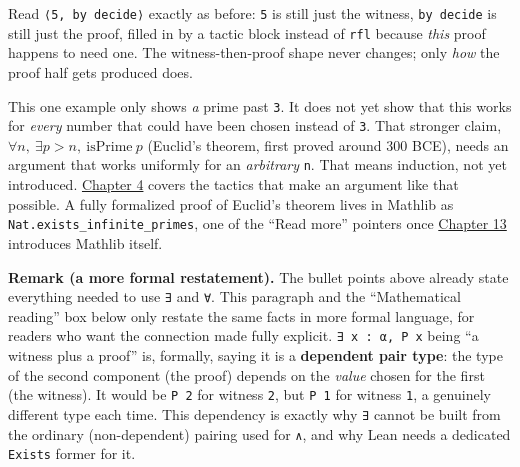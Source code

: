 Read \texttt{⟨5, by decide⟩} exactly as before: \texttt{5} is still just the witness, \texttt{by decide} is still just the proof, filled in by a tactic block instead of \texttt{rfl} because \emph{this} proof happens to need one. The witness-then-proof shape never changes; only \emph{how} the proof half gets produced does.

This one example only shows \emph{a} prime past \texttt{3}. It does not yet show that this works for \emph{every} number that could have been chosen instead of \texttt{3}. That stronger claim, \(\forall n,\ \exists p > n,\ \mathrm{isPrime}\ p\) (Euclid's theorem, first proved around 300 BCE), needs an argument that works uniformly for an \emph{arbitrary} \texttt{n}. That means induction, not yet introduced. \hyperref[sec:04-tactics:00-index:1]{Chapter 4} covers the tactics that make an argument like that possible. A fully formalized proof of Euclid's theorem lives in Mathlib as \texttt{Nat.exists\_\allowbreak{}infinite\_\allowbreak{}primes}, one of the ``Read more'' pointers once \hyperref[sec:13-next-steps:00-index:1]{Chapter 13} introduces Mathlib itself.

\textbf{Remark (a more formal restatement).} The bullet points above already state everything needed to use \texttt{∃} and \texttt{∀}. This paragraph and the ``Mathematical reading'' box below only restate the same facts in more formal language, for readers who want the connection made fully explicit. \texttt{∃ x : α, P x} being ``a witness plus a proof'' is, formally, saying it is a \textbf{dependent pair type}: the type of the second component (the proof) depends on the \emph{value} chosen for the first (the witness). It would be \texttt{P 2} for witness \texttt{2}, but \texttt{P 1} for witness \texttt{1}, a genuinely different type each time. This dependency is exactly why \texttt{∃} cannot be built from the ordinary (non-dependent) pairing used for \texttt{∧}, and why Lean needs a dedicated \texttt{Exists} former for it.

